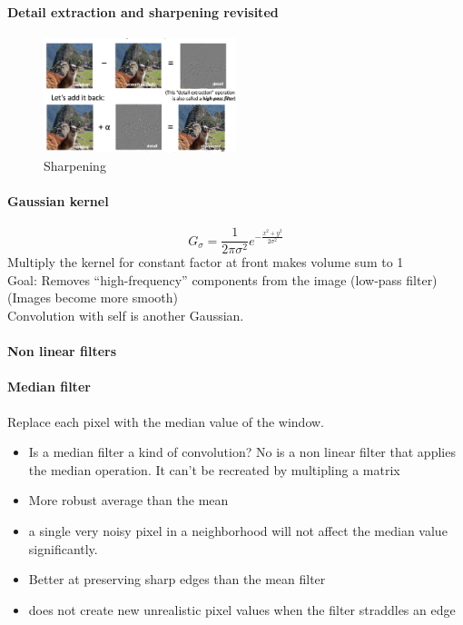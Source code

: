 \paragraph*{Detail extraction and sharpening revisited}
\begin{figure}[H]
    \centering
    \includegraphics*[width=0.5\textwidth]{Pictures/High_passing.png}
    \caption{Sharpening}
    \label{<label>}
\end{figure}


\paragraph*{Gaussian kernel}
\[
    G_\sigma = \frac{1}{2\pi\sigma^2} e^{-\frac{x^2 + y^2}{2\sigma^2}}
\]
Multiply the kernel for constant factor at front makes volume sum to 1\\

Goal: Removes “high-frequency” components from the
image (low-pass filter) (Images become more smooth)\\

Convolution with self is another Gaussian.


\paragraph*{Non linear filters}
\paragraph*{Median filter}
Replace each pixel with the median value of the window.

\begin{itemize}
    \item Is a median filter a kind of convolution?
          No is a non linear filter that applies the median operation.
          It can't be recreated by multipling a matrix
    \item More robust average than the mean
    \item a single very noisy pixel in a neighborhood will not
          affect the median value significantly.
    \item Better at preserving sharp edges than the
          mean filter
    \item does not create new unrealistic pixel values when
          the filter straddles an edge
\end{itemize}

